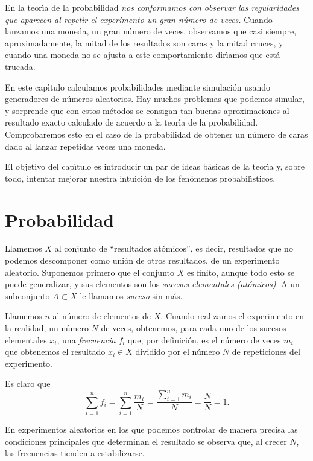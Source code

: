 En la teor\'{\i}a de la probabilidad {\itshape nos conformamos con observar las
regularidades que aparecen al repetir el experimento un gran n\'umero de veces.}
Cuando lanzamos una moneda, un gran n\'umero de veces,  observamos que casi
siempre, aproximadamente,  la mitad de los resultados son caras y la mitad
cruces, y cuando una
moneda no se ajusta a este comportamiento dir\'{\i}amos que 
est\'a trucada. %

En este cap\'{\i}tulo calculamos probabilidades mediante simulaci\'on usando
generadores de n\'umeros aleatorios. Hay muchos problemas que podemos simular, 
y  sorprende que con estos m\'etodos se consigan tan buenas aproximaciones al
resultado exacto calculado de acuerdo a la teor\'{\i}a de la probabilidad. 
Comprobaremos esto en el caso de la probabilidad de obtener un n\'umero de caras
dado al lanzar repetidas veces  una moneda.  

El objetivo del cap\'{\i}tulo es introducir un par de ideas b\'asicas de la
teor\'{\i}a y, sobre todo, intentar mejorar nuestra intuici\'on de los
fen\'omenos probabil\'{\i}sticos.





\section{Probabilidad}



Llamemos $X$ al conjunto de ``resultados at\'omicos'', es decir, resultados que
no podemos descomponer como uni\'on de otros resultados, de un experimento
aleatorio. Suponemos primero que el conjunto $X$ es finito, aunque todo esto se
puede generalizar,  y sus elementos son los {\itshape sucesos elementales
(at\'omicos)}. A un subconjunto $A\subset X$ le llamamos {\itshape suceso} sin
m\'as. 


Llamemos $n$ al n\'umero de elementos de $X$. Cuando realizamos el experimento
en la realidad, un n\'umero $N$ de veces, obtenemos, para cada uno de los
sucesos elementales $x_i$,  una {\itshape frecuencia} $f_i$ que, por
definici\'on,  es el n\'umero de veces $m_i$ que obtenemos el resultado $x_i\in
X$ dividido por el n\'umero $N$ de repeticiones del experimento.

Es claro que 
\[\sum_{i=1}^{n}f_i=\sum_{i=1}^{n} \frac{m_i}{N}=\frac{\sum_{i=1}^{n}
m_i}{N}=\frac{N}{N}=1.\]

En experimentos aleatorios en los que podemos controlar de manera precisa las
condiciones principales que determinan el resultado se observa que, al crecer
$N$,  las frecuencias tienden a estabilizarse. 

